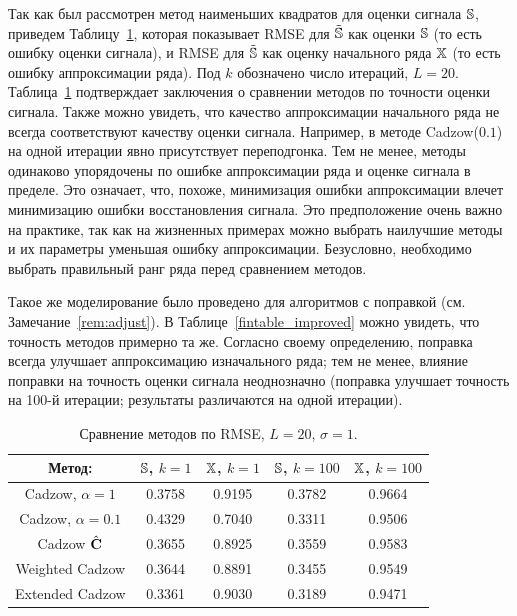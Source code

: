 \documentclass[12pt, specialist, subf,href,colorlinks=true,substylefile = spbu.rtx]{disser}
\theoremstyle{remark}
\theoremstyle{definition}
\begin{document}
\smallskip
Так как был рассмотрен метод наименьших квадратов для оценки сигнала
$\mathbb{S}$, приведем Таблицу~\ref{fintable}, которая показывает RMSE для $\tilde {\mathbb{S}}$ как оценки $\mathbb{S}$ (то есть ошибку оценки сигнала), и RMSE для $\tilde {\mathbb{S}}$ как оценку начального ряда $\mathbb{X}$ (то есть ошибку аппроксимации ряда). Под $k$ обозначено число итераций, $L=20$. Таблица~\ref{fintable} подтверждает заключения о сравнении методов по точности оценки сигнала. Также можно увидеть, что качество аппроксимации начального ряда не всегда соответствуют качеству оценки сигнала. Например, в методе Cadzow($0.1$) на одной итерации явно присутствует переподгонка. Тем не менее, методы одинаково упорядочены по ошибке аппроксимации ряда и оценке сигнала в пределе. Это означает, что, похоже, минимизация ошибки аппроксимации влечет минимизацию ошибки восстановления сигнала.
Это предположение очень важно на практике, так как на жизненных примерах можно выбрать наилучшие методы и их параметры уменьшая ошибку аппроксимации.
Безусловно, необходимо выбрать правильный ранг ряда перед сравнением методов.

Такое же моделирование было проведено для алгоритмов с поправкой (см. Замечание~\ref{rem:adjust}). В Таблице~\ref{fintable_improved} можно увидеть, что точность методов примерно та же. Согласно своему определению, поправка всегда улучшает аппроксимацию изначального ряда; тем не менее, влияние поправки на точность оценки сигнала неоднозначно (поправка улучшает точность на 100-й итерации; результаты различаются на одной итерации).

\begin{table}[!hhh]
	\caption{Сравнение методов по RMSE, $L = 20$, $\sigma=1$.}\label{fintable}
	\begin{center}
	    \begin{tabular}{|c|c|c|c|c|}
    		\hline
    		Метод: & $\mathbb{S}$, $k = 1$ & $\mathbb{X}$, $k = 1$ & $\mathbb{S}$, $k = 100$ & $\mathbb{X}$, $k = 100$  \\
		    \hline
		    Cadzow, $\alpha = 1$ & 0.3758 & 0.9195 & 0.3782 & 0.9664 \\
		    \hline
		    Cadzow, $\alpha = 0.1$ & 0.4329 & 0.7040 & 0.3311 & 0.9506 \\
		    \hline
		    Cadzow $\hat{\mathbf{C}}$ & 0.3655 & 0.8925 & 0.3559 & 0.9583 \\
		    \hline
		    Weighted Cadzow & 0.3644 & 0.8891 & 0.3455 & 0.9549 \\
		    \hline
		    Extended Cadzow & 0.3361 & 0.9030 & 0.3189 & 0.9471 \\
		    \hline
	    \end{tabular}
	\end{center}
\end{table}
\end{document}

